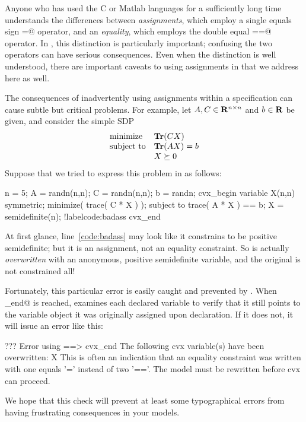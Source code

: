 \documentclass[12pt]{article}
\begin{document}
Anyone who has used the C or Matlab languages for a sufficiently long time
understands the differences between \emph{assignments}, which employ a single
equals sign \verb@=@ operator, and an \emph{equality}, which employs the
double equal \verb@==@ operator. In \cvx, this distinction is particularly
important; confusing the two operators can have serious consequences.
Even when the distinction is well understood, there are important caveats to
using assignments in \cvx that we address here as well.

The consequences of inadvertently using assignments within a \cvx specification
can cause subtle but critical problems. For example, let $A,C\in\mathbf{R}^{{n}\times{n}}$ and 
$b\in\R$ be given, and consider the simple SDP
\begin{equation}
	\begin{array}{ll}
		\text{minimize} & \operatorname{\textbf{Tr}} (CX) \\
		\text{subject to} & \operatorname{\textbf{Tr}} (AX) = b \\
		& X \succeq 0
	\end{array}
\end{equation}	
Suppose that we tried to express this problem in \cvx as follows:
\begin{code2}[firstnumber=1]
	n = 5;
	A = randn(n,n); C = randn(n,n); b = randn;
	cvx_begin
	    variable X(n,n) symmetric;
	    minimize( trace( C * X ) );
	    subject to
	        trace( A * X ) == b;
	        X = semidefinite(n);		!label{code:badass}
	cvx_end
\end{code2}
At first glance, line~\ref{code:badass} may look like it constrains \verb@X@ to be positive
semidefinite; but it is an assignment, not an equality constraint. So \verb@X@
is actually \emph{overwritten} with an anonymous, positive semidefinite variable,
and the original \verb@X@ is not constrained all!

Fortunately, this particular error is easily caught and prevented by \cvx. When
\verb@cvx_end@ is reached, \cvx examines each declared variable to verify that
it still points to the variable object it was originally assigned upon declaration. If it does not, 
it will issue an error like this:
\begin{code}
	??? Error using ==> cvx_end
	The following cvx variable(s) have been overwritten:
	   X
	This is often an indication that an equality constraint was
	written with one equals '=' instead of two '=='. The model
	must be rewritten before cvx can proceed.
\end{code}	
We hope that this check will prevent at least some typographical errors from 
having frustrating consequences in your models.
\end{document}
